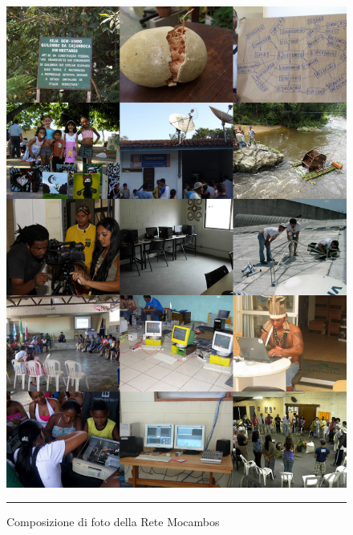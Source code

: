 \begin{figure}[htbp]
  \centering
  \includegraphics[width=\textwidth]{./Figure/FotoTesi.pdf}
  \rule{35em}{0.5pt}
  \caption[Composizione di foto della Rete Mocambos]{Composizione di
    foto della Rete Mocambos}
  \label{fig:FotoRM}
\end{figure}

